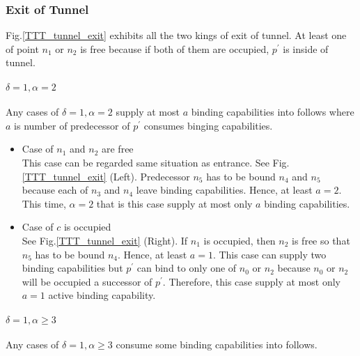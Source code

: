 \documentclass[runningheads]{llncs}
\begin{document}
\subsubsection{Exit of Tunnel}


Fig.\ref{TTT_tunnel_exit} exhibits all the two kings of exit of tunnel. 
At least one of point $n_1$ or $n_2$ is free because if both of them are occupied, $p^\prime$ is inside of tunnel.

\paragraph{$\delta = 1, \alpha = 2$}
 Any cases of $\delta = 1, \alpha = 2$ supply at most $a$ binding capabilities into follows where $a$ is number of predecessor of $p^\prime$ consumes binging capabilities.

\begin{itemize}
\item{Case of $n_1$ and $n_2$ are free}\\
  This case can be regarded same situation as entrance. See Fig.\ref{TTT_tunnel_exit} (Left). Predecessor $n_5$ has to be bound $n_4$ and $n_5$ because each of $n_3$ and $n_4$ leave binding capabilities. Hence, at least $a=2$. This time, $\alpha = 2$ that is this case supply at most only $a$ binding capabilities.
  
\item{Case of $c$ is occupied}\\
  See Fig.\ref{TTT_tunnel_exit} (Right). If $n_1$ is occupied, then $n_2$ is free so that $n_5$ has to be bound $n_4$. Hence, at least $a=1$. This case can supply two binding capabilities but $p^\prime$ can bind to only one of $n_0$ or $n_2$ because $n_0$ or $n_2$ will be occupied a successor of $p^\prime$. Therefore, this case supply at most only $a=1$ active binding capability.
  
\end{itemize}

\paragraph{$\delta = 1, \alpha \geq 3$}
Any cases of $\delta = 1, \alpha \geq 3$ consume some binding capabilities into follows.
\end{document}
